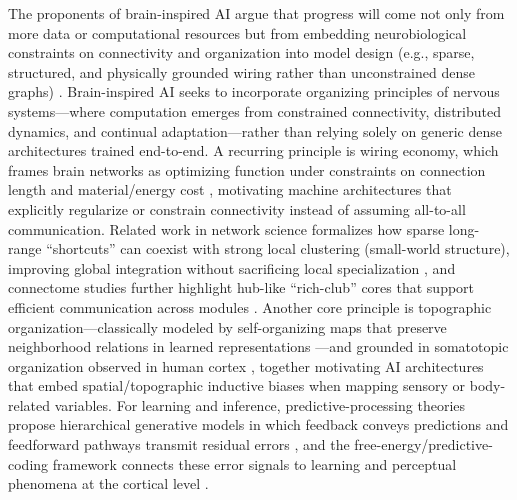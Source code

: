 \documentclass[letterpaper]{article}
\begin{document}
The proponents of brain-inspired AI  argue that progress will come not only from more data or computational resources but from embedding neurobiological constraints on connectivity and organization into model design (e.g., sparse, structured, and physically grounded wiring rather than unconstrained dense graphs) \cite{hassabis2017neuroscience, li2024brain}. Brain-inspired AI seeks to incorporate organizing principles of nervous systems—where computation emerges from constrained connectivity, distributed dynamics, and continual adaptation—rather than relying solely on generic dense architectures trained end-to-end.  A recurring principle is wiring economy, which frames brain networks as optimizing function under constraints on connection length and material/energy cost \cite{bullmore2012economy}, motivating machine architectures that explicitly regularize or constrain connectivity instead of assuming all-to-all communication.  Related work in network science formalizes how sparse long-range “shortcuts” can coexist with strong local clustering (small-world structure), improving global integration without sacrificing local specialization \cite{watts1998collective}, and connectome studies further highlight hub-like “rich-club” cores that support efficient communication across modules \cite{van2011rich}.  Another core principle is topographic organization—classically modeled by self-organizing maps that preserve neighborhood relations in learned representations \cite{kohonen1982self}—and grounded in somatotopic organization observed in human cortex \cite{penfield1937somatic}, together motivating AI architectures that embed spatial/topographic inductive biases when mapping sensory or body-related variables.  For learning and inference, predictive-processing theories propose hierarchical generative models in which feedback conveys predictions and feedforward pathways transmit residual errors \cite{rao1999predictive}, and the free-energy/predictive-coding framework connects these error signals to learning and perceptual phenomena at the cortical level \cite{friston2016activeinference}.  %
\end{document}
